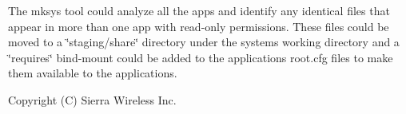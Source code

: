 The mksys tool could analyze all the apps and identify any identical files that appear in more than one app with read-\/only permissions. These files could be moved to a \char`\"{}staging/share\char`\"{} directory under the system\textquotesingle{}s working directory and a \char`\"{}requires\char`\"{} bind-\/mount could be added to the applications\textquotesingle{} root.\+cfg files to make them available to the applications.





Copyright (C) Sierra Wireless Inc. 